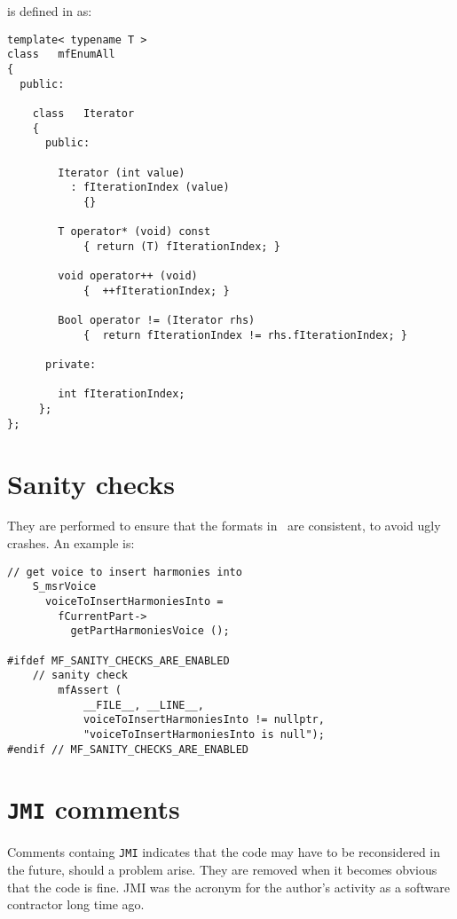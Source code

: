 \newpage

 is defined in  as:
\begin{lstlisting}[language=CPlusPlus]
template< typename T >
class   mfEnumAll
{
  public:

    class   Iterator
    {
      public:

        Iterator (int value)
          : fIterationIndex (value)
            {}

        T operator* (void) const
            { return (T) fIterationIndex; }

        void operator++ (void)
            {  ++fIterationIndex; }

        Bool operator != (Iterator rhs)
            {  return fIterationIndex != rhs.fIterationIndex; }

      private:

        int fIterationIndex;
     };
};
\end{lstlisting}


\section{Sanity checks}

They are performed to ensure that the formats in \mf\ are consistent, to avoid ugly crashes. An example is:
\begin{lstlisting}[language=CPlusPlus]
    // get voice to insert harmonies into
    S_msrVoice
      voiceToInsertHarmoniesInto =
        fCurrentPart->
          getPartHarmoniesVoice ();

#ifdef MF_SANITY_CHECKS_ARE_ENABLED
  	// sanity check
		mfAssert (
			__FILE__, __LINE__,
			voiceToInsertHarmoniesInto != nullptr,
			"voiceToInsertHarmoniesInto is null");
#endif // MF_SANITY_CHECKS_ARE_ENABLED
\end{lstlisting}


\section{{\tt JMI} comments}

Comments containg {\tt JMI} indicates that the code may have to be reconsidered in the future, should a problem arise. They are removed when it becomes obvious that the code is fine. JMI was the acronym for the author's activity as a software contractor long time ago.


